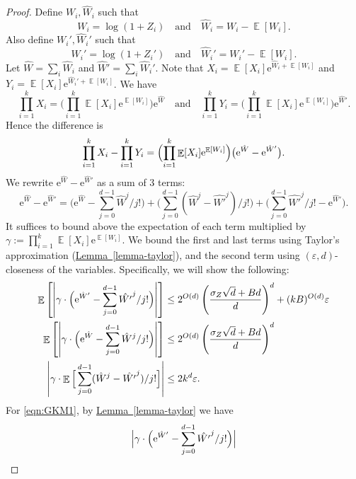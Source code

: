 \documentclass[11pt]{article}
\numberwithin{equation}{section}
\theoremstyle{definition}
\theoremstyle{plain}
\newcommand{\eee}{\mathrm e}
\newcommand{\expref}[2]{\hyperref[#2]{#1~\ref{#2}}}
\def\eps{\varepsilon}
\DeclarePairedDelimiter{\abs}{\lvert}{\rvert}
\DeclareMathOperator*{\E}{\mathbb{E}}                 %
\begin{document}
  \begin{proof}
    Define $W_i, \hat W_i$ such that
    \[
      W_i = \log(1 + Z_i) \quad \text{and} \quad \hat W_i = W_i - \E[W_i] .
    \]
    Also define $W_i', \hat W_i'$ such that
    \[
      W_i' = \log(1 + Z_i') \quad \text{and} \quad \hat W_i' = W_i' - \E[W_i] .
    \]
    Let $\hat W = \sum_i \hat W_i$ and $\hat W' = \sum_i \hat W_i'$.
    Note that $X_i = \E[X_i] \eee^{\hat W_i + \E[W_i]}$ and $Y_i = \E[X_i] \eee^{\hat W_i' + \E[W_i]}$.
    We have
    \[
      \prod_{i = 1}^k X_i = \Big( \prod_{i = 1}^k \E[X_i] \eee^{\E[W_i]} \Big) \eee^{\hat W}
      \quad \text{and} \quad
      \prod_{i = 1}^k Y_i = \Big( \prod_{i = 1}^k \E[X_i] \eee^{\E[W_i]} \Big) \eee^{\hat W'} .
    \]
    Hence the difference is
    \[
      \prod_{i = 1}^k X_i - \prod_{i = 1}^k Y_i
      = \Bigl( \prod_{i = 1}^k \E[X_i] \eee^{\E[W_i]} \Bigr) \bigl( \eee^{\hat W} - \eee^{\hat W'} \bigr) .
    \]
%
%
%
%
%
%
%
%
%
%
%
%
%
%
%
%
%
%
%
%
%
%
%
%
%
%
%
%
%
%
%
%
%
%
%
    We rewrite $\eee^{\hat W} - \eee^{\hat W'}$ as a sum of 3 terms:
    \[
      \eee^{\hat W} - \eee^{\hat W'}
      = \Big( \eee^{\hat W} - \sum_{j = 0}^{d-1} {\hat W}^j / j! \Big)
        + \Big( \sum_{j = 0}^{d-1} (\hat W^j - {\hat {W'}}^j) / j! \Big)
        + \Big( \sum_{j = 0}^{d-1} {\hat {W'}}^j / j! - \eee^{\hat W'} \Big) .
    \]
    It suffices to bound above the expectation of each term multiplied by $\gamma := \prod_{i = 1}^k \E[X_i] \eee^{\E[W_i]}$.
    We bound the first and last terms using Taylor's approximation (\expref{Lemma}{lemma-taylor}), and the second term using $(\eps, d)$-closeness of the variables.
    Specifically, we will show the following:
    \begin{align}
      \E \left[ \abs*{ \gamma \cdot \Big( \eee^{\hat W'} - \sum_{j = 0}^{d-1} {\hat {W'}}^j / j! \Big) } \right]
      &\le 2^{O(d)} \left( \frac{ \sigma_Z \sqrt{d} + Bd }{ d } \right)^d + (kB)^{O(d)} \eps \label{eqn:GKM1} \\
      \E \left[ \abs*{ \gamma \cdot \Big( \eee^{\hat W} - \sum_{j = 0}^{d-1} {\hat W}^j / j! \Big) } \right]
      &\le 2^{O(d)} \left( \frac{ \sigma_Z \sqrt{d} + Bd }{ d } \right)^d \label{eqn:GKM2} \\
      \abs*{ \gamma \cdot \E \Big[ \sum_{j = 0}^{d-1} (\hat W^j - {\hat {W'}}^j) / j! \Big] }
      &\le 2 k^d \eps .  \label{eqn:GKM3}
    \end{align}
    For \eqref{eqn:GKM1}, by \expref{Lemma}{lemma-taylor} we have
    \[
      \Bigl| \gamma \cdot \Bigl( \eee^{\hat W'} - \sum_{j = 0}^{d-1} {\hat {W'}}^j / j! \Bigr) \Bigr|
\]
\end{proof}
\end{document}
